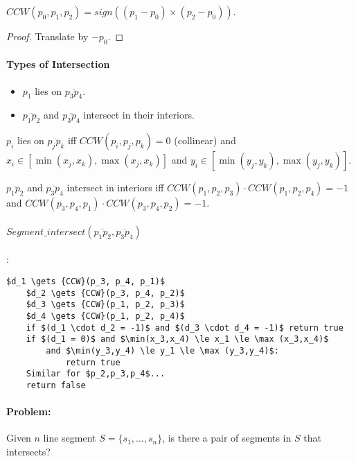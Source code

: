 \begin{mylemma}
	${CCW}(p_0, p_1, p_2) = {sign}((p_1 - p_0) \times (p_2 - p_0))$.
\end{mylemma}
\begin{proof}
	Translate by $-p_0$.
\end{proof}

\paragraph{Types of Intersection}
\begin{itemize}
	\item $p_1$ lies on $\overline{p_3 p_4}$.
	\item $\overline{p_1 p_2}$ and $\overline{p_3 p_4}$ intersect in their interiors.
\end{itemize}

\begin{myproposition}
$p_i$ lies on $\overline{p_j p_k}$ iff ${CCW}(p_i, p_j, p_k) = 0$ (collinear) and $x_i \in [\min(x_j, x_k), \max(x_j, x_k)]$ and 	$y_i \in [\min(y_j, y_k), \max(y_j, y_k)]$.
\end{myproposition}

\begin{myproposition}
$\overline{p_1 p_2}$ and $\overline{p_3 p_4}$ intersect in interiors iff ${CCW}(p_1, p_2, p_3) \cdot {CCW}(p_1,p_2,p_4) = -1$ and ${CCW}(p_3, p_4, p_1) \cdot {CCW}(p_3,p_4,p_2) = -1$.
\end{myproposition}

\paragraph{${Segment\_intersect}(\overline{p_1 p_2}, \overline{p_3 p_4})$}:
\begin{lstlisting}[mathescape]
	$d_1 \gets {CCW}(p_3, p_4, p_1)$
	$d_2 \gets {CCW}(p_3, p_4, p_2)$
	$d_3 \gets {CCW}(p_1, p_2, p_3)$
	$d_4 \gets {CCW}(p_1, p_2, p_4)$
	if $(d_1 \cdot d_2 = -1)$ and $(d_3 \cdot d_4 = -1)$ return true
	if $(d_1 = 0)$ and $\min(x_3,x_4) \le x_1 \le \max (x_3,x_4)$
		and $\min(y_3,y_4) \le y_1 \le \max (y_3,y_4)$:
			return true
	Similar for $p_2,p_3,p_4$...
	return false
\end{lstlisting}

\paragraph{Problem:} Given $n$ line segment $S=\{s_1, \ldots, s_n\}$, is there a pair of segments in $S$ that intersects?
